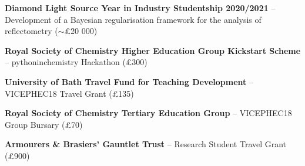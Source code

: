 \begin{cventriesy}
  \cventryy
    {
      \begin{cvitems}
        \item {\textbf{Diamond Light Source Year in Industry Studentship 2020/2021} -- Development of a Bayesian regularisation framework for the analysis of reflectometry ($\sim$£20 000)}
    \vspace{1mm}
        \item {\textbf{Royal Society of Chemistry Higher Education Group Kickstart Scheme} -- pythoninchemistry Hackathon (£300)}
    \vspace{1mm}
        \item {\textbf{University of Bath Travel Fund for Teaching Development} -- VICEPHEC18 Travel Grant (£135)}
    \vspace{1mm}
        \item {\textbf{Royal Society of Chemistry Tertiary Education Group} -- VICEPHEC18 Group Bursary (£70)}
    \vspace{1mm}
        \item {\textbf{Armourers \& Brasiers’ Gauntlet Trust} -- Research Student Travel Grant (£900)}
      \end{cvitems}
    }
\end{cventriesy}